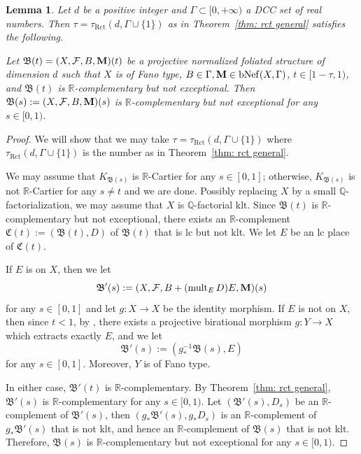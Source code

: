 \documentclass[11pt,reqno]{amsart}
\numberwithin{equation}{section}
\newcommand{\Mm}{{\bf{M}}}
\newcommand{\Cc}{\mathfrak{C}}
\newcommand{\mult}{\operatorname{mult}}
\newcommand{\Rct}{\operatorname{Rct}}
\newcommand{\Bb}{{\mathfrak{B}}}
\newcommand{\Ff}{\mathcal{F}}
\newcommand{\Ii}{\Gamma}
\newcommand{\bNef}{\mathrm{bNef}}
\newtheorem{lem}[thm]{Lemma}
\theoremstyle{definition}
\begin{document}
\begin{lem}\label{lem: gap exc threshold}
    Let $d$ be a positive integer and $\Ii\subset [0,+\infty)$ a DCC set of real numbers. Then $\tau=\tau_{\Rct}(d,\Ii\cup\{1\})$ as in Theorem~\ref{thm: rct general} satisfies the following. 
    
    Let $\Bb(t)=(X,\Ff,B,\Mm)(t)$ be a projective normalized foliated structure of dimension $d$ such that $X$ is of Fano type, $B\in\Ii,\Mm\in\bNef(X,\Ii)$, $t\in [1-\tau,1)$, and $\Bb(t)$ is $\mathbb R$-complementary but not exceptional. Then $\Bb(s):=(X,\Ff,B,\Mm)(s)$ is $\mathbb R$-complementary but not exceptional for any $s\in [0,1)$.
\end{lem}
\begin{proof}
We will show that we may take $\tau=\tau_{\Rct}(d,\Ii\cup\{1\})$ where $\tau_{\Rct}(d,\Ii\cup\{1\})$ is the number as in Theorem~\ref{thm: rct general}.

We may assume that $K_{\Bb(s)}$ is $\mathbb R$-Cartier for any $s\in [0,1]$; otherwise, $K_{\Bb(s)}$ is not $\mathbb R$-Cartier for any $s\neq t$ and we are done. Possibly replacing $X$ by a small $\mathbb Q$-factorialization, we may assume that $X$ is $\mathbb Q$-factorial klt. Since $\Bb(t)$ is $\mathbb R$-complementary but not exceptional, there exists an $\mathbb R$-complement $\Cc(t):=(\Bb(t),D)$ of $\Bb(t)$ that is lc but not klt. We let $E$ be an lc place of $\Cc(t)$. 

If $E$ is on $X$, then we let 
$$\Bb'(s):=(X,\Ff,B+(\mult_ED)E,\Mm)(s)$$ 
for any $s\in [0,1]$ and let $g: X\rightarrow X$ be the identity morphism. If $E$ is not on $X$, then since $t<1$, by \cite[Theorem~2.2.3]{Cas+25a}, there exists a projective birational morphism $g: Y\rightarrow X$ which extracts exactly $E$, and we let $$\Bb'(s):=(g^{-1}_*\Bb(s),E)$$
for any $s\in [0,1]$. Moreover, $Y$ is of Fano type.

In either case, $\Bb'(t)$ is $\mathbb R$-complementary. By Theorem~\ref{thm: rct general}, $\Bb'(s)$ is $\mathbb R$-complementary for any $s\in [0,1)$. Let $(\Bb'(s),D_s)$ be an $\mathbb R$-complement of $\Bb'(s)$, then $(g_*\Bb'(s),g_*D_s)$ is an $\mathbb R$-complement of $g_*\Bb'(s)$ that is not klt, and hence an $\mathbb R$-complement of $\Bb(s)$ that is not klt. Therefore, $\Bb(s)$ is $\mathbb R$-complementary but not exceptional for any $s\in [0,1)$.
\end{proof}
\end{document}
